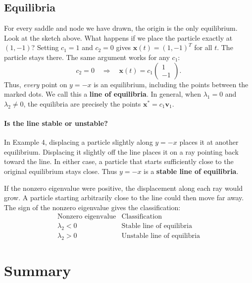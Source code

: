 \documentclass[10pt,letterpaper]{article}
\begin{document}
\subsection{Equilibria}

For every saddle and node we have drawn, the origin is the only equilibrium. Look at the sketch above. What happens if we place the particle exactly at $(1,-1)$? Setting $c_1=1$ and $c_2=0$ gives $\mathbf{x}(t)=(1,-1)^T$ for all
$t$. The particle stays there. The same argument works for any $c_1$:
\[
    c_2=0
    \quad\Longrightarrow\quad
    \mathbf{x}(t)=c_1\begin{pmatrix}1\\-1\end{pmatrix}.
\]
Thus, \emph{every} point on $y=-x$ is an equilibrium, including the
points between the marked dots. We call this a \textbf{line of
equilibria}. In general, when $\lambda_1=0$ and $\lambda_2\ne0$,
the equilibria are precisely the points
$\mathbf{x}^*=c_1\mathbf{v}_1$.

\paragraph{Is the line stable or unstable?}
In Example 4, displacing a particle slightly along $y=-x$ places it
at another equilibrium. Displacing it slightly off the line places it
on a ray pointing back toward the line. In either case, a particle
that starts sufficiently close to the original equilibrium stays close.
Thus $y=-x$ is a \textbf{stable line of equilibria}.


If the nonzero eigenvalue were positive, the displacement along each
ray would grow. A particle starting arbitrarily close to the line
could then move far away. The sign of the nonzero eigenvalue gives
the classification:
\[
    \boxed{
    \begin{array}{c|c}
        \text{Nonzero eigenvalue} & \text{Classification}\\ \hline
        \lambda_2<0 & \text{Stable line of equilibria}\\
        \lambda_2>0 & \text{Unstable line of equilibria}
    \end{array}}
\]

\section{Summary}
\end{document}
